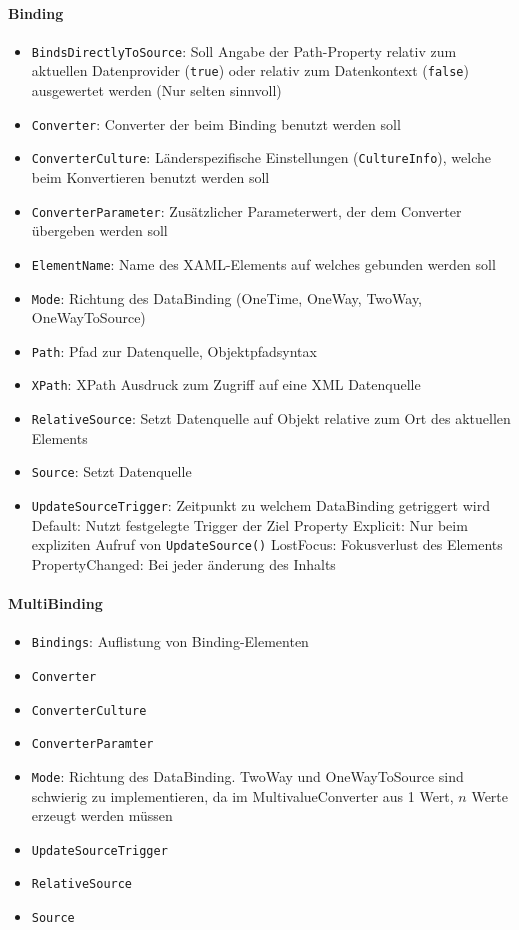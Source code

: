 \paragraph{Binding}
\begin{itemize}
\item \verb+BindsDirectlyToSource+: Soll Angabe der Path-Property relativ zum aktuellen Datenprovider (\verb+true+) oder relativ zum Datenkontext (\verb+false+) ausgewertet werden (Nur selten sinnvoll)
\item \verb+Converter+: Converter der beim Binding benutzt werden soll
\item \verb+ConverterCulture+: Länderspezifische Einstellungen (\verb+CultureInfo+), welche beim Konvertieren benutzt werden soll
\item \verb+ConverterParameter+: Zusätzlicher Parameterwert, der dem Converter übergeben werden soll
\item \verb+ElementName+: Name des XAML-Elements auf welches gebunden werden soll
\item \verb+Mode+: Richtung des DataBinding (OneTime, OneWay, TwoWay, OneWayToSource)
\item \verb+Path+: Pfad zur Datenquelle, Objektpfadsyntax
\item \verb+XPath+: XPath Ausdruck zum Zugriff auf eine XML Datenquelle
\item \verb+RelativeSource+: Setzt Datenquelle auf Objekt relative zum Ort des aktuellen Elements
\item \verb+Source+: Setzt Datenquelle
\item \verb+UpdateSourceTrigger+: Zeitpunkt zu welchem DataBinding getriggert wird
    \subitem Default: Nutzt festgelegte Trigger der Ziel Property
    \subitem Explicit: Nur beim expliziten Aufruf von \verb+UpdateSource()+
    \subitem LostFocus: Fokusverlust des Elements
    \subitem PropertyChanged: Bei jeder änderung des Inhalts
\end{itemize}
\paragraph{MultiBinding}
\begin{itemize}
\item \verb+Bindings+: Auflistung von Binding-Elementen
\item \verb+Converter+
\item \verb+ConverterCulture+
\item \verb+ConverterParamter+
\item \verb+Mode+: Richtung des DataBinding. TwoWay und OneWayToSource sind schwierig zu implementieren, da im MultivalueConverter aus 1 Wert, $n$ Werte erzeugt werden müssen
\item \verb+UpdateSourceTrigger+
\item \verb+RelativeSource+
\item \verb+Source+
\end{itemize}
